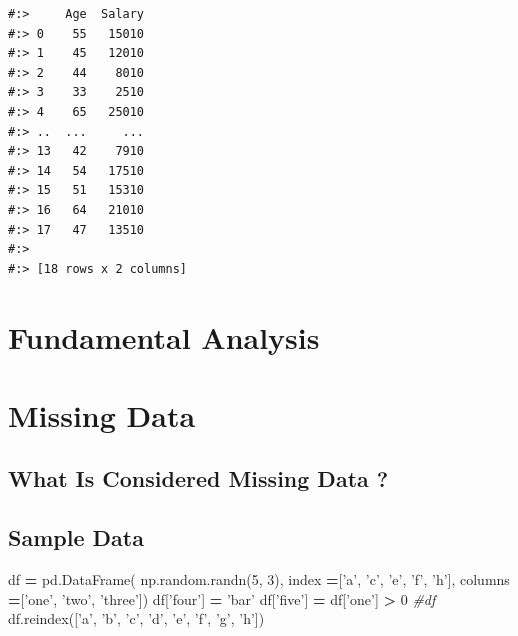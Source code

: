 \documentclass[
]{book}
\newenvironment{Shaded}{\begin{snugshade}}{\end{snugshade}}
\newcommand{\CommentTok}[1]{\textcolor[rgb]{0.37,0.37,0.37}{\textit{#1}}}
\newcommand{\DecValTok}[1]{\textcolor[rgb]{0.06,0.06,0.06}{#1}}
\newcommand{\NormalTok}[1]{#1}
\newcommand{\OperatorTok}[1]{\textcolor[rgb]{0.43,0.43,0.43}{\textbf{#1}}}
\newcommand{\StringTok}[1]{\textcolor[rgb]{0.5,0.5,0.5}{#1}}
\begin{document}
\begin{verbatim}
#:>     Age  Salary
#:> 0    55   15010
#:> 1    45   12010
#:> 2    44    8010
#:> 3    33    2510
#:> 4    65   25010
#:> ..  ...     ...
#:> 13   42    7910
#:> 14   54   17510
#:> 15   51   15310
#:> 16   64   21010
#:> 17   47   13510
#:> 
#:> [18 rows x 2 columns]
\end{verbatim}

\hypertarget{fundamental-analysis}{%
\section{Fundamental Analysis}\label{fundamental-analysis}}

\hypertarget{missing-data}{%
\section{Missing Data}\label{missing-data}}

\hypertarget{what-is-considered-missing-data}{%
\subsection{What Is Considered Missing Data ?}\label{what-is-considered-missing-data}}

\hypertarget{sample-data-15}{%
\subsection{Sample Data}\label{sample-data-15}}

\begin{Shaded}
\begin{Highlighting}[]
\NormalTok{df }\OperatorTok{=}\NormalTok{ pd.DataFrame( np.random.randn(}\DecValTok{5}\NormalTok{, }\DecValTok{3}\NormalTok{), }
\NormalTok{                   index   }\OperatorTok{=}\NormalTok{[}\StringTok{'a'}\NormalTok{, }\StringTok{'c'}\NormalTok{, }\StringTok{'e'}\NormalTok{, }\StringTok{'f'}\NormalTok{, }\StringTok{'h'}\NormalTok{],}
\NormalTok{                   columns }\OperatorTok{=}\NormalTok{[}\StringTok{'one'}\NormalTok{, }\StringTok{'two'}\NormalTok{, }\StringTok{'three'}\NormalTok{])}
\NormalTok{df[}\StringTok{'four'}\NormalTok{] }\OperatorTok{=} \StringTok{'bar'}
\NormalTok{df[}\StringTok{'five'}\NormalTok{] }\OperatorTok{=}\NormalTok{ df[}\StringTok{'one'}\NormalTok{] }\OperatorTok{>} \DecValTok{0}
\CommentTok{#df}
\NormalTok{df.reindex([}\StringTok{'a'}\NormalTok{, }\StringTok{'b'}\NormalTok{, }\StringTok{'c'}\NormalTok{, }\StringTok{'d'}\NormalTok{, }\StringTok{'e'}\NormalTok{, }\StringTok{'f'}\NormalTok{, }\StringTok{'g'}\NormalTok{, }\StringTok{'h'}\NormalTok{])}
\end{Highlighting}
\end{Shaded}
\end{document}
